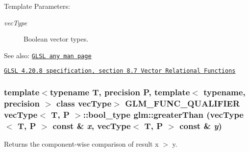 \begin{Desc}
\item[Template Parameters:]
\begin{description}
\item[{\em vecType}]Boolean vector types.\end{description}
\end{Desc}
\begin{Desc}
\item[See also:]\href{http://www.opengl.org/sdk/docs/manglsl/xhtml/any.xml}{\tt GLSL any man page} 

\href{http://www.opengl.org/registry/doc/GLSLangSpec.4.20.8.pdf}{\tt GLSL 4.20.8 specification, section 8.7 Vector Relational Functions} \end{Desc}
\hypertarget{group__core__func__vector__relational_g752f4c03f55a280172de9ceff7a02b51}{
\subsubsection[greaterThan]{\setlength{\rightskip}{0pt plus 5cm}template$<$typename T, precision P, template$<$ typename, precision $>$ class vecType$>$ GLM\_\-FUNC\_\-QUALIFIER vecType$<$ T, P $>$::bool\_\-type glm::greaterThan (vecType$<$ T, P $>$ const \& {\em x}, \/  vecType$<$ T, P $>$ const \& {\em y})}}
\label{group__core__func__vector__relational_g752f4c03f55a280172de9ceff7a02b51}


Returns the component-wise comparison of result x $>$ y.

